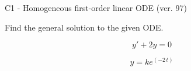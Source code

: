 \begin{exercise}
  \begin{exerciseTitle}C1 - Homogeneous first-order linear ODE (ver. 97)\end{exerciseTitle}
  \begin{exerciseStatement}
    
Find the general solution to the given ODE.

    
\[y'+2y=0\]

  \end{exerciseStatement}
  \begin{exerciseAnswer}
    
\[y= k e^{\left(-2 \, t\right)}\]

  \end{exerciseAnswer}
\end{exercise}